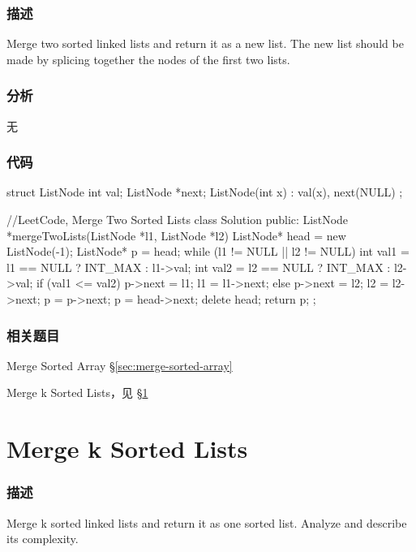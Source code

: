\subsubsection{描述}
Merge two sorted linked lists and return it as a new list. The new list should be made by splicing together the nodes of the first two lists.


\subsubsection{分析}
无


\subsubsection{代码}
\begin{Code}
struct ListNode {
    int val;
    ListNode *next;
    ListNode(int x) :
            val(x), next(NULL) {
    }
};
 
//LeetCode, Merge Two Sorted Lists
class Solution {
public:
    ListNode *mergeTwoLists(ListNode *l1, ListNode *l2) {
        ListNode* head = new ListNode(-1);
        ListNode* p = head;
        while (l1 != NULL || l2 != NULL) {
            int val1 = l1 == NULL ? INT_MAX : l1->val;
            int val2 = l2 == NULL ? INT_MAX : l2->val;
            if (val1 <= val2) {
                p->next = l1;
                l1 = l1->next;
            } else {
                p->next = l2;
                l2 = l2->next;
            }
            p = p->next;
        }
        p = head->next;
        delete head;
        return p;
    }
};
\end{Code}


\subsubsection{相关题目}
\begindot
\item Merge Sorted Array \S \ref{sec:merge-sorted-array}
\item Merge k Sorted Lists，见 \S \ref{sec:merge-k-sorted-lists}
\myenddot


\section{Merge k Sorted Lists} %
\label{sec:merge-k-sorted-lists}


\subsubsection{描述}
Merge k sorted linked lists and return it as one sorted list. Analyze and describe its complexity.


